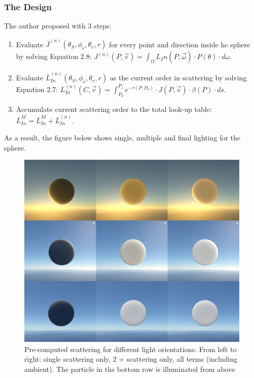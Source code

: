 \subsubsection{The Design}
The author proposed with 3 steps:
\begin{enumerate}
\item Evaluate $\overline{J}^{(n)}(\theta_S, \phi_v, \theta_v, r)$  for every point and direction inside he sphere by solving Equation 2.8: $J^{(n)}(P, \vec{v}) = \int_{\Omega}L_In(P, \vec{\omega}) \cdot P(\theta) \cdot d\omega$.
\item Evaluate $\overline{L}_{In}^{(n)}(\theta_S, \phi_v, \theta_v, r)$ as the current order in scattering by solving Equation 2.7: $L_{In}^{(n)}(C, \vec{v}) = \int_{P_0}^{P_1}e^{-\tau(P, P_0)} \cdot J(P, \vec{v}) \cdot \beta(P) \cdot ds$.
\item Accumulate current scattering order to the total look-up table: $\overline{L}_{In}^M = \overline{L}_{In}^M + \overline{L}_{In}^{(n)}$.
\end{enumerate}
As a result, the figure below shows single, multiple and final lighting for the sphere.
\begin{figure}[htp]
\begin{center}
\includegraphics[scale=0.1]{images/scatteringresult.png}
\caption{Pre-computed scattering for different light orientations.
From left to right: single scattering only, 2 + scattering
only, all terms (including ambient). The particle in the bottom
row is illuminated from above}
\label{f12}
\end{center}
\end{figure}
